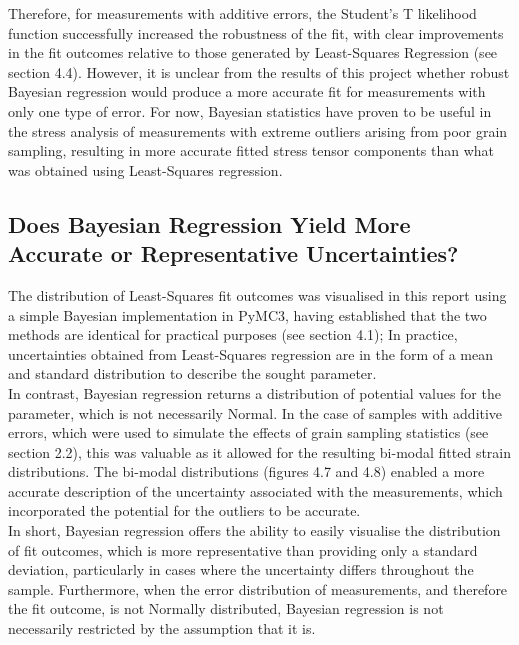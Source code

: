 Therefore, for measurements with additive errors, the Student's T likelihood function successfully increased the robustness of the fit, with clear improvements in the fit outcomes relative to those generated by Least-Squares Regression (see section 4.4). However, it is unclear from the results of this project whether robust Bayesian regression would produce a more accurate fit for measurements with only one type of error. For now, Bayesian statistics have proven to be useful in the stress analysis of measurements with extreme outliers arising from poor grain sampling, resulting in more accurate fitted stress tensor components than what was obtained using Least-Squares regression.\\ 


\subsection{Does Bayesian Regression Yield More Accurate or Representative Uncertainties?}
\label{subsec:subsec01}

The distribution of Least-Squares fit outcomes was visualised in this report using a simple Bayesian implementation in PyMC3, having established that the two methods are identical for practical purposes (see section 4.1); In practice, uncertainties obtained from Least-Squares regression are in the form of a mean and standard distribution to describe the sought parameter. \\

In contrast, Bayesian regression returns a distribution of potential values for the parameter, which is not necessarily Normal. In the case of samples with additive errors, which were used to simulate the effects of grain sampling statistics (see section 2.2), this was valuable as it allowed for the resulting bi-modal fitted strain distributions. The bi-modal distributions (figures 4.7 and 4.8) enabled a more accurate description of the uncertainty associated with the measurements, which incorporated the potential for the outliers to be accurate.  \\

In short, Bayesian regression offers the ability to easily visualise the distribution of fit outcomes, which is more representative than providing only a standard deviation, particularly in cases where the uncertainty differs throughout the sample. Furthermore, when the error distribution of measurements, and therefore the fit outcome, is not Normally distributed, Bayesian regression is not necessarily restricted by the assumption that it is.\\


